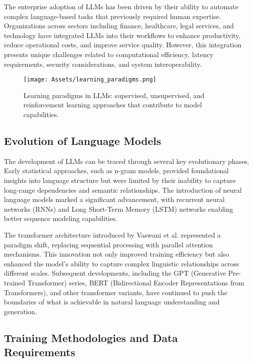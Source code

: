 The enterprise adoption of LLMs has been driven by their ability to automate complex language-based tasks that previously required human expertise. Organizations across sectors including finance, healthcare, legal services, and technology have integrated LLMs into their workflows to enhance productivity, reduce operational costs, and improve service quality. However, this integration presents unique challenges related to computational efficiency, latency requirements, security considerations, and system interoperability.

\begin{figure}[H]
    \centering
    \texttt{[image: Assets/learning\_paradigms.png]}
    \caption{Learning paradigms in LLMs: supervised, unsupervised, and reinforcement learning approaches that contribute to model capabilities.}
    \label{fig:learning_paradigms}
\end{figure}

\subsection{Evolution of Language Models}

The development of LLMs can be traced through several key evolutionary phases. Early statistical approaches, such as n-gram models, provided foundational insights into language structure but were limited by their inability to capture long-range dependencies and semantic relationships. The introduction of neural language models marked a significant advancement, with recurrent neural networks (RNNs) and Long Short-Term Memory (LSTM) networks enabling better sequence modeling capabilities.

The transformer architecture introduced by Vaswani et al. represented a paradigm shift, replacing sequential processing with parallel attention mechanisms. This innovation not only improved training efficiency but also enhanced the model's ability to capture complex linguistic relationships across different scales. Subsequent developments, including the GPT (Generative Pre-trained Transformer) series, BERT (Bidirectional Encoder Representations from Transformers), and other transformer variants, have continued to push the boundaries of what is achievable in natural language understanding and generation.

\subsection{Training Methodologies and Data Requirements}


